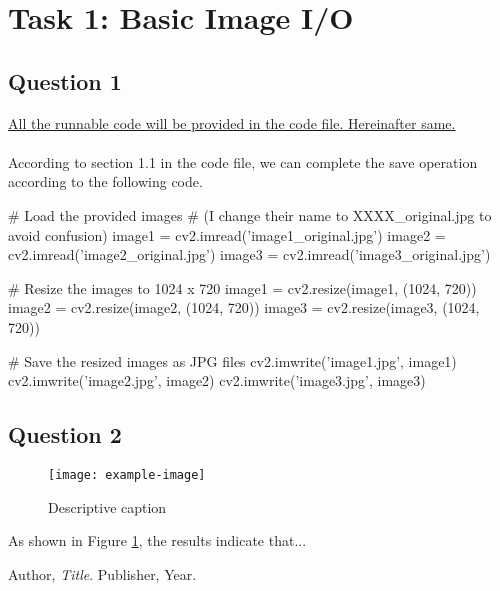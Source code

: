 \documentclass[12pt]{article}
\begin{document}
\section{Task 1: Basic Image I/O}

\subsection{Question 1}
\underline{All the runnable code will be provided in the code file. Hereinafter same.}\\
\\
\quad According to section 1.1 in the code file, we can complete the save operation according to the following code.
\begin{python}
# Load the provided images 
# (I change their name to XXXX_original.jpg to avoid confusion)
image1 = cv2.imread('image1_original.jpg')
image2 = cv2.imread('image2_original.jpg')
image3 = cv2.imread('image3_original.jpg')

# Resize the images to 1024 x 720
image1 = cv2.resize(image1, (1024, 720))
image2 = cv2.resize(image2, (1024, 720))
image3 = cv2.resize(image3, (1024, 720))

# Save the resized images as JPG files
cv2.imwrite('image1.jpg', image1)
cv2.imwrite('image2.jpg', image2)
cv2.imwrite('image3.jpg', image3)
\end{python}

\subsection{Question 2}

\lipsum[1] %

\begin{figure}[h]
\centering
\texttt{[image: example-image]}
\caption{Descriptive caption}
\label{fig:example}
\end{figure}

As shown in Figure \ref{fig:example}, the results indicate that...

\begin{thebibliography}{9}
  Author,
  \emph{Title}.
  Publisher, Year.
\end{thebibliography}
\end{document}
